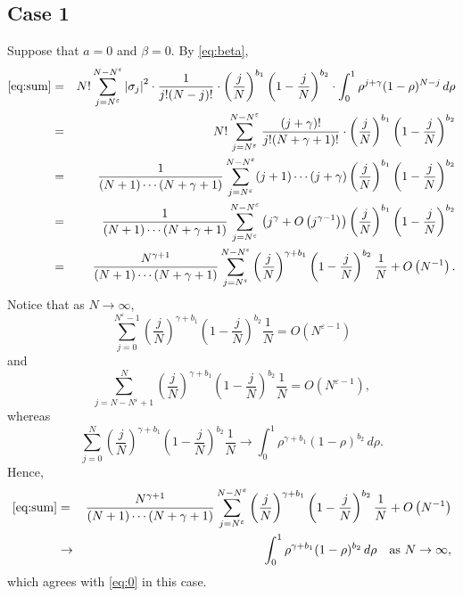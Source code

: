 \documentclass[12pt,reqno]{amsart}
\newcommand\ve{\varepsilon}
\theoremstyle{plain}
\theoremstyle{remark}
\numberwithin{equation}{section}
\begin{document}
\subsection{Case 1} 
Suppose that $a=0$ and $\beta=0$. By \eqref{eq:beta},
\begin{eqnarray*}
\eqref{eq:sum}&=&N!\sum_{j=N^\ve}^{N-N^\ve}\left|\sigma_j\right|^2\cdot\frac{1}{j!(N-j)!}\cdot\left(\frac jN\right)^{b_1}\left(1-\frac jN\right)^{b_2}\cdot\int_0^1\rho^{j+\gamma}(1-\rho)^{N-j}\,d\rho\\
&=&N!\sum_{j=N^\ve}^{N-N^\ve}\frac{(j+\gamma)!}{j!(N+\gamma+1)!}\cdot\left(\frac jN\right)^{b_1}\left(1-\frac jN\right)^{b_2}\\
&=&\frac{1}{(N+1)\cdots(N+\gamma+1)}\sum_{j=N^\ve}^{N-N^\ve}(j+1)\cdots(j+\gamma)\left(\frac jN\right)^{b_1}\left(1-\frac jN\right)^{b_2}\\
&=&\frac{1}{(N+1)\cdots(N+\gamma+1)}\sum_{j=N^\ve}^{N-N^\ve}\left(j^\gamma+O\left(j^{\gamma-1}\right)\right)\left(\frac jN\right)^{b_1}\left(1-\frac jN\right)^{b_2}\\
&=&\frac{N^{\gamma+1}}{(N+1)\cdots(N+\gamma+1)}\sum_{j=N^\ve}^{N-N^\ve}\left(\frac jN\right)^{\gamma+b_1}\left(1-\frac jN\right)^{b_2}\frac1N+O\left(N^{-1}\right).
\end{eqnarray*}
Notice that as $N\to\infty$,
$$\sum_{j=0}^{N^\ve-1}\left(\frac jN\right)^{\gamma+b_1}\left(1-\frac jN\right)^{b_2}\frac1N=O\left(N^{\ve-1}\right)$$
and
$$\sum_{j=N-N^\ve+1}^{N}\left(\frac jN\right)^{\gamma+b_1}\left(1-\frac jN\right)^{b_2}\frac1N=O\left(N^{\ve-1}\right),$$
whereas
$$\sum_{j=0}^{N}\left(\frac jN\right)^{\gamma+b_1}\left(1-\frac jN\right)^{b_2}\frac1N\to\int_0^1\rho^{\gamma+b_1}(1-\rho)^{b_2}\,d\rho.$$
Hence,
\begin{eqnarray*}
\eqref{eq:sum}&=&\frac{N^{\gamma+1}}{(N+1)\cdots(N+\gamma+1)}\sum_{j=N^\ve}^{N-N^\ve}\left(\frac jN\right)^{\gamma+b_1}\left(1-\frac jN\right)^{b_2}\frac1N+O\left(N^{-1}\right)\\
&\to&\int_0^1\rho^{\gamma+b_1}(1-\rho)^{b_2}\,d\rho\quad\text{as }N\to\infty,
\end{eqnarray*}
which agrees with \eqref{eq:0} in this case.
\end{document}
